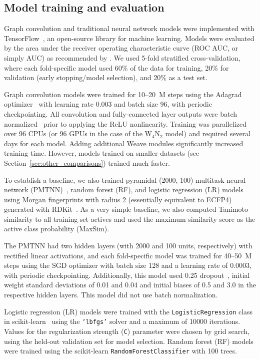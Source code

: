 \subsection{Model training and evaluation}
\label{sec:training}

Graph convolution and traditional neural network models were implemented with
TensorFlow~\citep{abaditensorflow}, an open-source library for machine learning.
Models were evaluated by the area under the receiver operating characteristic
curve (ROC AUC, or simply AUC) as recommended by \citet{jain2008recommendations}. We used 5-fold
stratified cross-validation, where each fold-specific model used 60\% of the
data for training, 20\% for validation (early stopping/model selection), and 20\% as a test set.

Graph convolution models were trained for 10--20~M steps using the Adagrad
optimizer~\citep{duchi2011adaptive} with learning rate 0.003 and batch size 96,
with periodic checkpointing. All convolution and fully-connected layer outputs
were batch normalized~\citep{ioffe2015batch} prior to applying the ReLU
nonlinearity. Training was parallelized over 96 CPUs (or 96 GPUs in the case of
the W$_4$N$_2$ model) and required several days for each model. Adding
additional Weave modules significantly increased training time. However, models
trained on smaller datasets (see Section~\ref{sec:other_comparisons}) trained
much faster.

To establish a baseline, we also trained pyramidal (2000, 100) multitask neural
network (PMTNN)~\citep{ramsundar2015massively}, random forest (RF), and logistic
regression (LR) models using Morgan fingerprints with radius 2 (essentially
equivalent to ECFP4) generated with RDKit~\citep{landrumrdkit}. As a very simple
baseline, we also computed Tanimoto similarity to all training set actives and
used the maximum similarity score as the active class probability (MaxSim).

The PMTNN had two hidden layers (with 2000 and 100 units, respectively) with
rectified linear activations, and each fold-specific model was trained for
40--50~M steps using the SGD optimizer with batch size 128 and a learning rate
of 0.0003, with periodic checkpointing. Additionally, this model used 0.25
dropout~\citep{srivastava2014dropout}, initial weight standard deviations of
0.01 and 0.04 and initial biases of 0.5 and 3.0 in the respective hidden layers.
This model did not use batch normalization.

Logistic regression (LR) models were
trained with the \texttt{LogisticRegression} class in
scikit-learn~\citep{pedregosa2011scikit} using the \texttt{`lbfgs'} solver and
a maximum of \num{10000} iterations. Values for the regularization strength
(\texttt{C}) parameter were chosen by grid search, using the held-out validation
set for model selection. Random forest (RF) models were trained using the
scikit-learn \texttt{RandomForestClassifier} with 100 trees.

